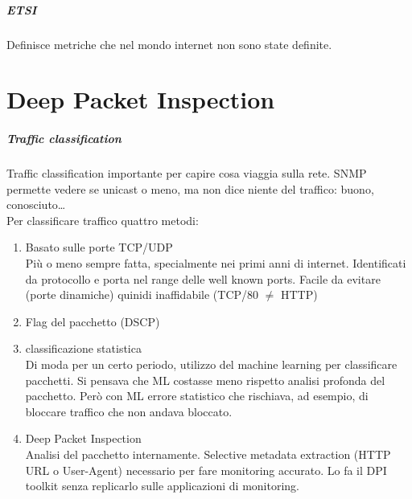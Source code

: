 \documentclass[10pt]{book}
\begin{document}
\paragraph{ETSI} Definisce metriche che nel mondo internet non sono state definite.\\
\chapter{Deep Packet Inspection}
\paragraph{Traffic classification} Traffic classification importante per capire cosa viaggia sulla rete. SNMP permette vedere se unicast o meno, ma non dice niente del traffico: buono, conosciuto\ldots\\
Per classificare traffico quattro metodi:
\begin{enumerate}
	\item Basato sulle porte TCP/UDP\\
	Più o meno sempre fatta, specialmente nei primi anni di internet. Identificati da protocollo e porta nel range delle well known ports. Facile da evitare (porte dinamiche) quinidi inaffidabile (TCP/80 $\neq$ HTTP)
	\item Flag del pacchetto (DSCP)\\
	
	\item classificazione statistica\\
	Di moda per un certo periodo, utilizzo del machine learning per classificare pacchetti. Si pensava che ML costasse meno rispetto analisi profonda del pacchetto. Però con ML errore statistico che rischiava, ad esempio, di bloccare traffico che non andava bloccato.
	\item Deep Packet Inspection\\
	Analisi del pacchetto internamente. Selective metadata extraction (HTTP URL o User-Agent) necessario per fare monitoring accurato. Lo fa il DPI toolkit senza replicarlo sulle applicazioni di monitoring.
\end{enumerate}
\end{document}
